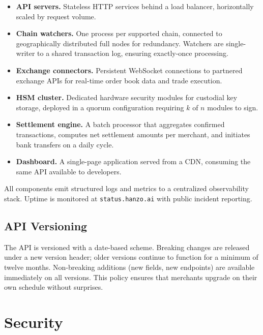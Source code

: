 \documentclass[11pt,letterpaper]{article}
\begin{document}
\begin{itemize}[leftmargin=1.1em]
    \item \textbf{API servers.}  Stateless HTTP services behind a load
    balancer, horizontally scaled by request volume.
    \item \textbf{Chain watchers.}  One process per supported chain, connected
    to geographically distributed full nodes for redundancy.  Watchers are
    single-writer to a shared transaction log, ensuring exactly-once
    processing.
    \item \textbf{Exchange connectors.}  Persistent WebSocket connections to
    partnered exchange APIs for real-time order book data and trade execution.
    \item \textbf{HSM cluster.}  Dedicated hardware security modules for
    custodial key storage, deployed in a quorum configuration requiring $k$
    of $n$ modules to sign.
    \item \textbf{Settlement engine.}  A batch processor that aggregates
    confirmed transactions, computes net settlement amounts per merchant, and
    initiates bank transfers on a daily cycle.
    \item \textbf{Dashboard.}  A single-page application served from a CDN,
    consuming the same API available to developers.
\end{itemize}

All components emit structured logs and metrics to a centralized observability
stack.  Uptime is monitored at \texttt{status.hanzo.ai} with public incident
reporting.

\subsection{API Versioning}

The API is versioned with a date-based scheme.  Breaking changes are released
under a new version header; older versions continue to function for a minimum
of twelve months.  Non-breaking additions (new fields, new endpoints) are
available immediately on all versions.  This policy ensures that merchants
upgrade on their own schedule without surprises.

\section{Security}
\label{sec:security}
\end{document}
